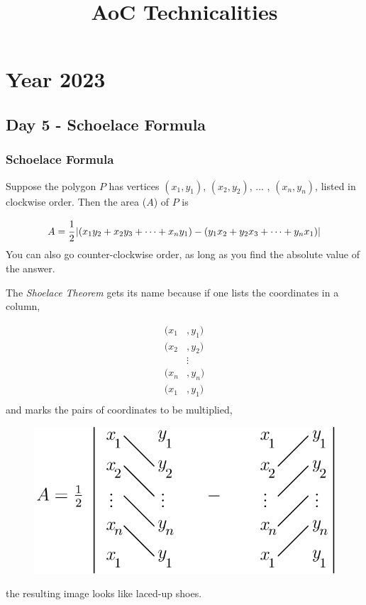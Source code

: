 \documentclass[]{scrartcl}
\title{AoC Technicalities}
\author{}
\begin{document}
\maketitle

\section{Year 2023}

\subsection{Day 5 - Schoelace Formula}
\subsubsection{Schoelace Formula}

Suppose the polygon $P$ has vertices $(x_1, y_1)$, $(x_2, y_2)$, ... , $(x_n, y_n)$, listed in clockwise order. Then the area ($A$) of $P$ is

\begin{equation}
A = \cfrac{1}{2} \left|(x_1y_2 + x_2y_3 + \cdots + x_ny_1) - (y_1x_2 + y_2x_3 + \cdots + y_nx_1) \right|
\end{equation}
You can also go counter-clockwise order, as long as you find the absolute value of the answer.

The \emph{Shoelace Theorem} gets its name because if one lists the coordinates in a column,

\begin{align*} 
	(x_1 &, y_1) \\ 
	(x_2 &, y_2) \\ & \vdots \\ (x_n &, y_n) \\ (x_1 &, y_1) \\ 
\end{align*}
and marks the pairs of coordinates to be multiplied,

\begin{figure}[htbp]
\centering
\includegraphics[width=0.45\linewidth]{schoelace}
\end{figure}
the resulting image looks like laced-up shoes.
\end{document}
